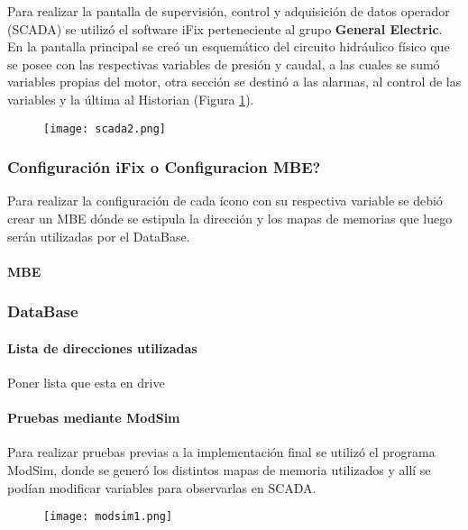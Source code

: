 Para realizar la pantalla de supervisión, control y adquisición de datos operador (SCADA) se utilizó el software iFix perteneciente al grupo \textbf{General Electric}.\\
En la pantalla principal se creó un esquemático del circuito hidráulico físico que se posee con las respectivas variables de presión y caudal, a las cuales se sumó variables propias del motor, otra sección se destinó a las alarmas, al control de las variables y la última al Historian (Figura \ref{fig:scada1}).

\begin{figure}[htb]
	\centering
	\texttt{[image: scada2.png]}
	\label{fig:scada1}
\end{figure}


\subsubsection{Configuración iFix o Configuracion MBE?}
Para realizar la configuración de cada ícono con su respectiva variable se debió crear un MBE dónde se estipula la dirección y los mapas de memorias que luego serán utilizadas por el DataBase. 


\paragraph{MBE}
\subsubsection{DataBase}

\paragraph{Lista de direcciones utilizadas}
Poner lista que esta en drive
\paragraph{Pruebas mediante ModSim}
Para realizar pruebas previas a la implementación final se utilizó el programa ModSim, donde se generó los distintos mapas de memoria utilizados y allí se podían modificar variables para observarlas en SCADA.

\begin{figure}[htb]
	\centering
	\texttt{[image: modsim1.png]}
	\label{fig:modsim1}
\end{figure}

